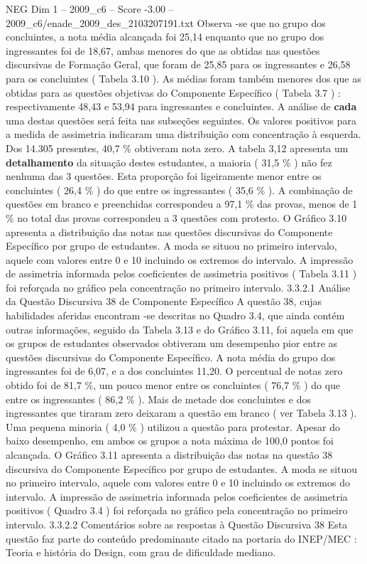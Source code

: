\begin{textsample}{NEG Dim 1 – 2009\_c6 – Score -3.00 – 2009\_c6/enade\_2009\_des\_2103207191.txt}
Observa -se que no grupo dos concluintes, a nota média alcançada foi 25,14 enquanto que no grupo dos ingressantes foi de 18,67, ambas menores do que as obtidas nas questões discursivas de Formação Geral, que foram de 25,85 para os ingressantes e 26,58 para os concluintes ( Tabela 3.10 ).
As médias foram também menores dos que as obtidas para as questões objetivas do Componente Específico ( Tabela 3.7 ) : respectivamente 48,43 e 53,94 para ingressantes e concluintes.
A análise de \textbf{cada} uma destas questões será feita nas subseções seguintes.
Os valores positivos para a medida de assimetria indicaram uma distribuição com concentração à esquerda.
Dos 14.305 presentes, 40,7 \% obtiveram nota zero.
A tabela 3,12 apresenta um \textbf{detalhamento} da situação destes estudantes, a maioria ( 31,5 \% ) não fez nenhuma das 3 questões.
Esta proporção foi ligeiramente menor entre os concluintes ( 26,4 \% ) do que entre os ingressantes ( 35,6 \% ).
A combinação de questões em branco e preenchidas correspondeu a 97,1 \% das provas, menos de 1 \% no total das provas correspondeu a 3 questões com protesto.
O Gráfico 3.10 apresenta a distribuição das notas nas questões discursivas do Componente Específico por grupo de estudantes.
A moda se situou no primeiro intervalo, aquele com valores entre 0 e 10 incluindo os extremos do intervalo.
A impressão de assimetria informada pelos coeficientes de assimetria positivos ( Tabela 3.11 ) foi reforçada no gráfico pela concentração no primeiro intervalo. 3.3.2.1 Análise da Questão Discursiva 38 de Componente Específico A questão 38, cujas habilidades aferidas encontram -se descritas no Quadro 3.4, que ainda contém outras informações, seguido da Tabela 3.13 e do Gráfico 3.11, foi aquela em que os grupos de estudantes observados obtiveram um desempenho pior entre as questões discursivas do Componente Específico.
A nota média do grupo dos ingressantes foi de 6,07, e a dos concluintes 11,20.
O percentual de notas zero obtido foi de 81,7 \%, um pouco menor entre os concluintes ( 76,7 \% ) do que entre os ingressantes ( 86,2 \% ).
Mais de metade dos concluintes e dos ingressantes que tiraram zero deixaram a questão em branco ( ver Tabela 3.13 ).
Uma pequena minoria ( 4,0 \% ) utilizou a questão para protestar.
Apesar do baixo desempenho, em ambos os grupos a nota máxima de 100,0 pontos foi alcançada.
O Gráfico 3.11 apresenta a distribuição das notas na questão 38 discursiva do Componente Específico por grupo de estudantes.
A moda se situou no primeiro intervalo, aquele com valores entre 0 e 10 incluindo os extremos do intervalo.
A impressão de assimetria informada pelos coeficientes de assimetria positivos ( Quadro 3.4 ) foi reforçada no gráfico pela concentração no primeiro intervalo. 3.3.2.2 Comentários sobre as respostas à Questão Discursiva 38 Esta questão faz parte do conteúdo predominante citado na portaria do INEP/MEC : Teoria e história do Design, com grau de dificuldade mediano.

\end{textsample}
